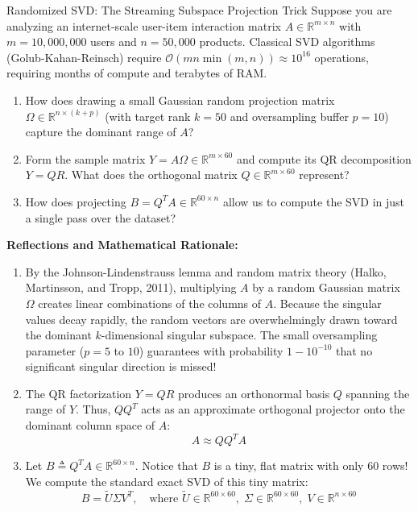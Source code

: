 \begin{ponderbox}{Randomized SVD: The Streaming Subspace Projection Trick}
Suppose you are analyzing an internet-scale user-item interaction matrix $A \in \mathbb{R}^{m \times n}$ with $m = 10{,}000{,}000$ users and $n = 50{,}000$ products. Classical SVD algorithms (Golub-Kahan-Reinsch) require $\mathcal{O}(m n \min(m, n)) \approx 10^{16}$ operations, requiring months of compute and terabytes of RAM.
\begin{enumerate}
    \item How does drawing a small Gaussian random projection matrix $\Omega \in \mathbb{R}^{n \times (k + p)}$ (with target rank $k = 50$ and oversampling buffer $p = 10$) capture the dominant range of $A$?
    \item Form the sample matrix $Y = A \Omega \in \mathbb{R}^{m \times 60}$ and compute its QR decomposition $Y = Q R$. What does the orthogonal matrix $Q \in \mathbb{R}^{m \times 60}$ represent?
    \item How does projecting $B = Q^T A \in \mathbb{R}^{60 \times n}$ allow us to compute the SVD in just a single pass over the dataset?
\end{enumerate}
\tcblower
\textbf{Reflections and Mathematical Rationale:}
\begin{enumerate}
    \item By the Johnson-Lindenstrauss lemma and random matrix theory (Halko, Martinsson, and Tropp, 2011), multiplying $A$ by a random Gaussian matrix $\Omega$ creates linear combinations of the columns of $A$. Because the singular values decay rapidly, the random vectors are overwhelmingly drawn toward the dominant $k$-dimensional singular subspace. The small oversampling parameter ($p = 5$ to $10$) guarantees with probability $1 - 10^{-10}$ that no significant singular direction is missed!
    \item The QR factorization $Y = Q R$ produces an orthonormal basis $Q$ spanning the range of $Y$. Thus, $Q Q^T$ acts as an approximate orthogonal projector onto the dominant column space of $A$:
    \begin{equation*}
    A \approx Q Q^T A
    \end{equation*}
    \item Let $B \triangleq Q^T A \in \mathbb{R}^{60 \times n}$. Notice that $B$ is a tiny, flat matrix with only $60$ rows!
    We compute the standard exact SVD of this tiny matrix:
    \begin{equation*}
    B = \tilde{U} \Sigma V^T, \quad \text{where } \tilde{U} \in \mathbb{R}^{60 \times 60}, \; \Sigma \in \mathbb{R}^{60 \times 60}, \; V \in \mathbb{R}^{n \times 60}

\end{equation*}
\end{enumerate}
\end{ponderbox}
